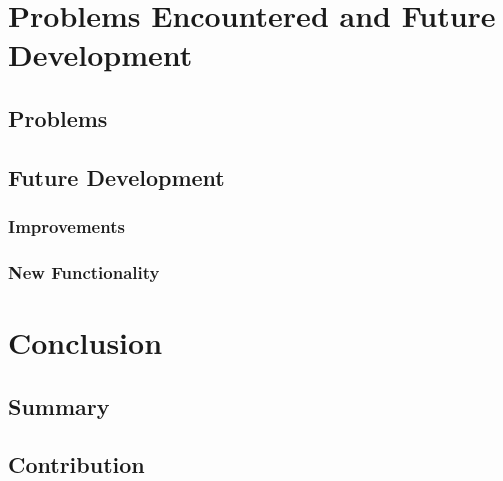 \documentclass{l4proj}
\begin{document}
\chapter{Problems Encountered and Future Development}


\section{Problems}


\section{Future Development}


\subsection{Improvements}


\subsection{New Functionality}


\chapter{Conclusion}

\section{Summary}


\section{Contribution}







\end{document}

